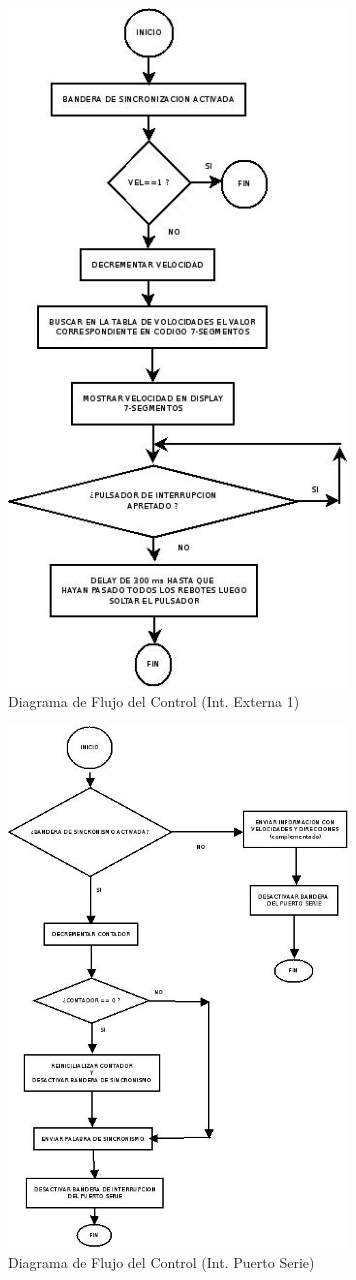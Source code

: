 \documentclass[a4paper,10pt]{article}
\begin{document}
					\newpage
					\begin{figure}[!htb]
						\centering
						\includegraphics[width=9cm]{Imagenes/DiagFlujoControl2.jpg}
						\caption{Diagrama de Flujo del Control (Int. Externa 1)} \label{ControlFlujo3}
					\end{figure}

					\newpage
					\begin{figure}[!htb]
						\centering
						\includegraphics[width=9cm]{Imagenes/DiagFlujoControl1.jpg}
						\caption{Diagrama de Flujo del Control (Int. Puerto Serie)} \label{ControlFlujo4}
					\end{figure}
\end{document}
